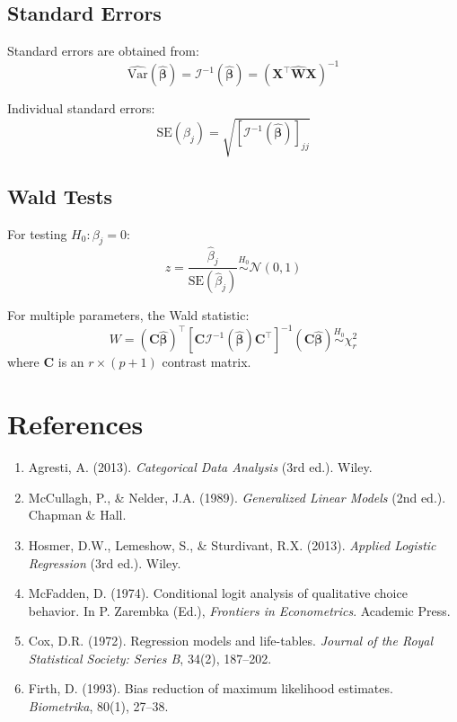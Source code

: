 \documentclass[11pt,letterpaper]{article}
\theoremstyle{definition}
\newcommand{\Var}{\mathrm{Var}}
\newcommand{\X}{\mathbf{X}}
\newcommand{\bb}{\boldsymbol{\beta}}
\newcommand{\W}{\mathbf{W}}
\newcommand{\I}{\mathcal{I}}
\begin{document}
\subsection{Standard Errors}

Standard errors are obtained from:
\begin{equation}
    \widehat{\Var}(\hat{\bb}) = \I^{-1}(\hat{\bb}) = (\X^\top \hat{\W} \X)^{-1}
\end{equation}

Individual standard errors:
\begin{equation}
    \text{SE}(\hat{\beta}_j) = \sqrt{[\I^{-1}(\hat{\bb})]_{jj}}
\end{equation}

\subsection{Wald Tests}

For testing $H_0: \beta_j = 0$:
\begin{equation}
    z = \frac{\hat{\beta}_j}{\text{SE}(\hat{\beta}_j)} \stackrel{H_0}{\sim} \mathcal{N}(0, 1)
\end{equation}

For multiple parameters, the Wald statistic:
\begin{equation}
    W = (\mathbf{C}\hat{\bb})^\top [\mathbf{C} \I^{-1}(\hat{\bb}) \mathbf{C}^\top]^{-1} (\mathbf{C}\hat{\bb}) \stackrel{H_0}{\sim} \chi^2_r
\end{equation}
where $\mathbf{C}$ is an $r \times (p+1)$ contrast matrix.

\section{References}

\begin{enumerate}
    \item Agresti, A. (2013). \textit{Categorical Data Analysis} (3rd ed.). Wiley.
    \item McCullagh, P., \& Nelder, J.A. (1989). \textit{Generalized Linear Models} (2nd ed.). Chapman \& Hall.
    \item Hosmer, D.W., Lemeshow, S., \& Sturdivant, R.X. (2013). \textit{Applied Logistic Regression} (3rd ed.). Wiley.
    \item McFadden, D. (1974). Conditional logit analysis of qualitative choice behavior. In P. Zarembka (Ed.), \textit{Frontiers in Econometrics}. Academic Press.
    \item Cox, D.R. (1972). Regression models and life-tables. \textit{Journal of the Royal Statistical Society: Series B}, 34(2), 187--202.
    \item Firth, D. (1993). Bias reduction of maximum likelihood estimates. \textit{Biometrika}, 80(1), 27--38.
\end{enumerate}
\end{document}
